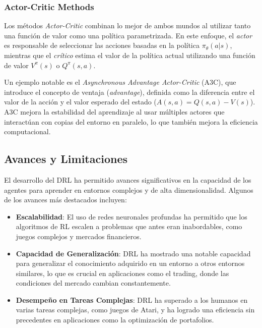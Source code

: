 \documentclass[a4paper,12pt]{report}
\begin{document}
\subsubsection{Actor-Critic Methods}

Los métodos \textit{Actor-Critic} combinan lo mejor de ambos mundos al utilizar tanto una función de valor como una política parametrizada. En este enfoque, el \textit{actor} es responsable de seleccionar las acciones basadas en la política \(\pi_{\theta}(a|s)\), mientras que el \textit{crítico} estima el valor de la política actual utilizando una función de valor \(V^{\pi}(s)\) o \(Q^{\pi}(s, a)\). 

Un ejemplo notable es el \textit{Asynchronous Advantage Actor-Critic} (A3C), que introduce el concepto de ventaja (\textit{advantage}), definida como la diferencia entre el valor de la acción y el valor esperado del estado (\(A(s, a) = Q(s, a) - V(s)\)). A3C mejora la estabilidad del aprendizaje al usar múltiples actores que interactúan con copias del entorno en paralelo, lo que también mejora la eficiencia computacional.

\subsection{Avances y Limitaciones}

El desarrollo del DRL ha permitido avances significativos en la capacidad de los agentes para aprender en entornos complejos y de alta dimensionalidad. Algunos de los avances más destacados incluyen:

\begin{itemize}
    \item \textbf{Escalabilidad}: El uso de redes neuronales profundas ha permitido que los algoritmos de RL escalen a problemas que antes eran inabordables, como juegos complejos y mercados financieros.
    \item \textbf{Capacidad de Generalización}: DRL ha mostrado una notable capacidad para generalizar el conocimiento adquirido en un entorno a otros entornos similares, lo que es crucial en aplicaciones como el trading, donde las condiciones del mercado cambian constantemente.
    \item \textbf{Desempeño en Tareas Complejas}: DRL ha superado a los humanos en varias tareas complejas, como juegos de Atari, y ha logrado una eficiencia sin precedentes en aplicaciones como la optimización de portafolios.
\end{itemize}
\end{document}
